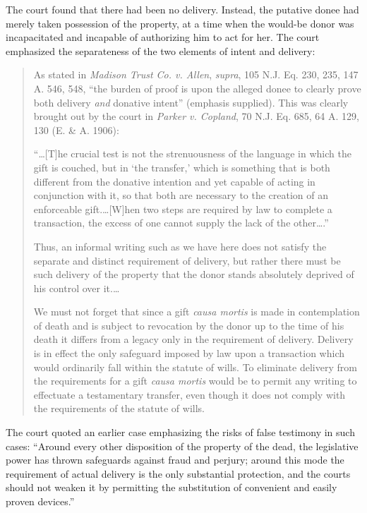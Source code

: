 The court found that there had been no delivery.  Instead, the putative donee
had merely taken possession of the property, at a time when the would-be donor
was incapacitated and incapable of authorizing him to act for her.  The court
emphasized the separateness of the two elements of intent and delivery:
\begin{quotation}
As stated in \emph{Madison Trust Co. v. Allen}, \emph{supra}, 105 N.J. Eq. 230,
235, 147 A.
546, 548, ``the burden of proof is upon the alleged donee to clearly prove both
delivery \textit{and} donative intent'' (emphasis supplied). This was clearly
brought out by the court in \emph{Parker v. Copland}, 70 N.J. Eq. 685, 64 A.
129, 130 (E. \& A. 1906):

``\ldots [T]he crucial test is not the strenuousness of the language in which
the gift is couched, but in `the transfer,' which is something that is both
different from the donative intention and yet capable of acting in conjunction
with it, so that both are necessary to the creation of an enforceable
gift.\ldots [W]hen two steps are required by law to complete a transaction, the
excess of one cannot supply the lack of the other\ldots.''

Thus, an informal writing such as we have here does not satisfy the separate and
distinct requirement of delivery, but rather there must be such delivery of the
property that the donor stands absolutely deprived of his control over it.\ldots

We must not forget that since a gift \textit{causa mortis} is made in
contemplation of death and is subject to revocation by the donor up to the time
of his death it differs from a legacy only in the requirement of delivery.
Delivery is in effect the only safeguard imposed by law upon a transaction
which would ordinarily fall within the statute of wills. To eliminate delivery
from the requirements for a gift \textit{causa mortis} would be to permit any
writing to effectuate a testamentary transfer, even though it does not comply
with the requirements of the statute of wills.
\end{quotation}
The court quoted an earlier case emphasizing the risks of false testimony in
such cases: ``Around every other disposition of the property of the dead,
the legislative power has thrown safeguards against fraud and perjury; around
this mode the requirement of actual delivery is the only substantial
protection, and the courts should not weaken it by permitting the substitution
of convenient and easily proven devices.''

